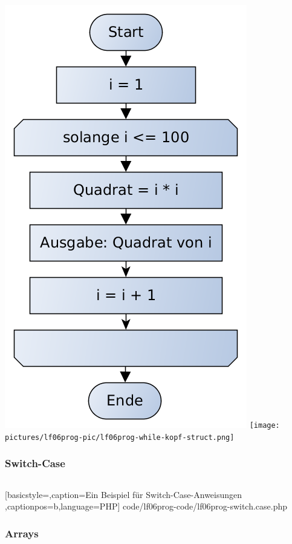 \includegraphics[scale=0.4]{pictures/lf06prog-pic/lf06prog-while-kopf-pap.png}
\texttt{[image: pictures/lf06prog-pic/lf06prog-while-kopf-struct.png]}

\subsubsection{Switch-Case}
\begin{tabular}{l|l|l}

\end{tabular}

	[basicstyle=\small,caption={Ein Beispiel für Switch-Case-Anweisungen}
	\label{lst:Switch-Case},captionpos=b,language=PHP]
	{code/lf06prog-code/lf06prog-switch.case.php}


\subsubsection{Arrays}

